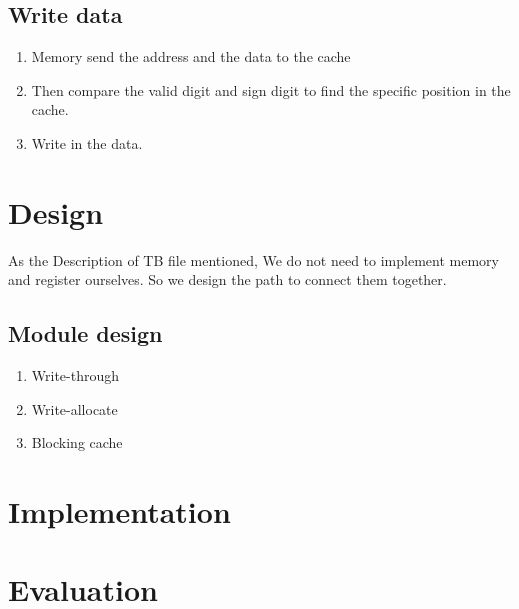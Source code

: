 \documentclass[12pt,a4paper]{article}
\begin{document}
\subsection{Write data}

\begin{enumerate}
\item Memory send the address and the data to the cache
\item Then compare the valid digit and sign digit to find the specific position in the cache.
\item Write in the data.

\end{enumerate}

\newpage

\section{Design}

As the Description of TB file mentioned, We do not need to implement memory and register ourselves.
So we design the path to connect them together.

\subsection{Module design}
\begin{enumerate}
\item Write-through
\item Write-allocate
\item Blocking cache
\end{enumerate}
\newpage

\section{Implementation}


\newpage

\section{Evaluation}
\end{document}
